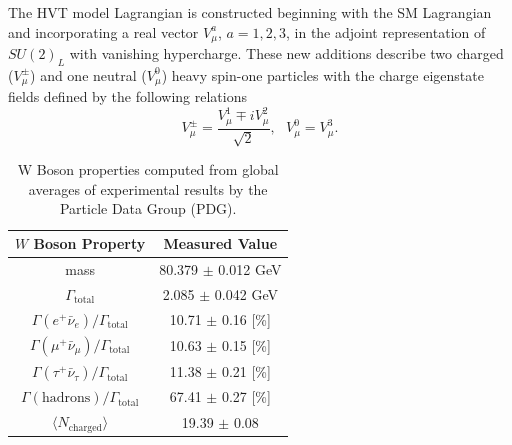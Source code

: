 The HVT model Lagrangian is constructed beginning with the SM Lagrangian and incorporating a real vector $V_\mu^a$, $a=1,2,3$, in the adjoint representation of $SU(2)_L$ with vanishing hypercharge.
These new additions describe two charged ($V_\mu^\pm$) and one neutral ($V_\mu^0$) heavy spin-one particles with the charge eigenstate fields defined by the following relations
\begin{equation}
V_\mu^\pm = \frac{V_\mu^1 \mp iV_\mu^2}{\sqrt{2}},\ \ \ V_\mu^0 = V_\mu^3.
\end{equation}

\begin{table}[!htb]
\begin{center}
\begin{tabular}{|c|c|}
\hline
$W$ Boson Property & Measured Value \\ \hline
mass & 80.379 $\pm$ 0.012 GeV \\
\hline
$\Gamma_{\mathrm{total}}$ & 2.085 $\pm$ 0.042 GeV \\
$\Gamma(e^+ \bar{\nu}_e) / \Gamma_{\mathrm{total}}$ & 10.71 $\pm$ 0.16 [\%]\\
$\Gamma(\mu^+ \bar{\nu}_\mu) / \Gamma_{\mathrm{total}}$ & 10.63 $\pm$ 0.15 [\%]\\
$\Gamma(\tau^+ \bar{\nu}_\tau) / \Gamma_{\mathrm{total}}$ & 11.38 $\pm$ 0.21 [\%]\\
$\Gamma(\mathrm{hadrons}) / \Gamma_{\mathrm{total}}$ & 67.41 $\pm$ 0.27 [\%]\\
\hline
$\langle N_{\mathrm{charged}} \rangle$ & 19.39 $\pm$ 0.08 \\
\hline
\end{tabular}
\caption{
W Boson properties computed from global averages of experimental results by the Particle Data Group (PDG). \cite{PDG:PhysRevD.98.030001}
}
\label{tab:w_props}
\end{center}
\end{table}

